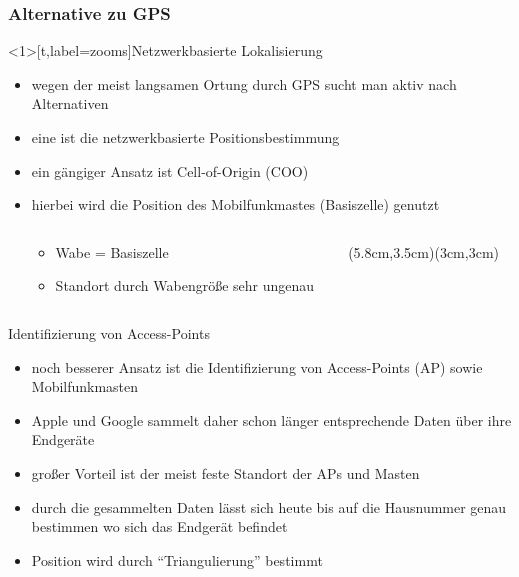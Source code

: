 \subsubsection{Alternative zu GPS}
\begin{frame}<1>[t,label=zooms]{Netzwerkbasierte Lokalisierung}
\begin{itemize}
  \item wegen der meist langsamen Ortung durch GPS sucht man aktiv nach Alternativen
  \item eine ist die netzwerkbasierte Positionsbestimmung
  \item ein gängiger Ansatz ist Cell-of-Origin (COO)
  \item hierbei wird die Position des Mobilfunkmastes (Basiszelle) genutzt
  \begin{columns}
  \begin{column}{.47\textwidth}
  \begin{itemize}
  \vspace{-2cm}
  \normalsize \item Wabe = Basiszelle
  \item Standort durch Wabengröße sehr ungenau 
  \end{itemize}
  \end{column}
  \begin{column}{.45\textwidth}
  \begin{center}
  \vspace{-0.5cm}
  (5.8cm,3.5cm)(3cm,3cm)
  \end{center}
  \end{column}
  \end{columns}
\end{itemize}
\end{frame}

\begin{frame}{Identifizierung von Access-Points}
\begin{itemize}
  \item noch besserer Ansatz ist die Identifizierung von Access-Points (AP) sowie Mobilfunkmasten
  \item Apple und Google sammelt daher schon länger entsprechende Daten über ihre Endgeräte
  \item großer Vorteil ist der meist feste Standort der APs und Masten
  \item durch die gesammelten Daten lässt sich heute bis auf die Hausnummer genau bestimmen wo sich das Endgerät befindet
  \item Position wird durch "`Triangulierung"' bestimmt
\end{itemize}
\end{frame}

